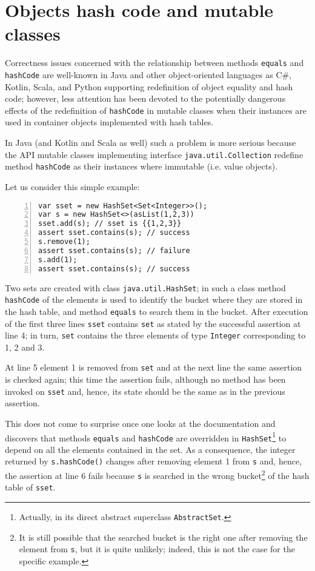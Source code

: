 \section{Objects hash code and mutable classes}

Correctness issues concerned with the relationship between methods \lstinline{equals} and \lstinline{hashCode} are well-known
in Java \cite{Bloch18,OkanoHSON19} and other object-oriented languages as C\#, Kotlin, Scala, and Python supporting redefinition
of object equality and hash code; however, less attention has been devoted to the potentially dangerous effects of the redefinition of 
\lstinline{hashCode} in mutable classes when their instances are used in container objects implemented with hash tables.

In Java (and Kotlin and Scala as well)  such a problem is more serious because the API mutable classes implementing interface \lstinline{java.util.Collection} redefine method \lstinline{hashCode} as their instances where immutable (i.e. value objects).

Let us consider this simple example:
\begin{lstlisting}[numbers=left]
var sset = new HashSet<Set<Integer>>();
var s = new HashSet<>(asList(1,2,3))
sset.add(s); // sset is {{1,2,3}}
assert sset.contains(s); // success
s.remove(1);
assert sset.contains(s); // failure
s.add(1);
assert sset.contains(s); // success
\end{lstlisting}
Two sets are created with class \lstinline{java.util.HashSet}; in such a class method \lstinline{hashCode} of the elements is used to identify the
bucket where they are stored in the hash table, and method \lstinline{equals} to search them in the bucket.
After execution of the first three lines \lstinline{sset} contains \lstinline{set} as stated by the successful assertion at line 4; in turn, \lstinline{set}
contains the three elements of type \lstinline{Integer} corresponding to 1, 2 and 3.

At line 5 element 1 is removed from \lstinline{set} and at the next line the same assertion is checked again; this time the assertion fails, although no method has been invoked on \lstinline{sset} and, hence, its state should be the same as in the previous assertion.

This does not come to surprise once one looks at the documentation and discovers that methods \lstinline{equals} and \lstinline{hashCode} are overridden in \lstinline{HashSet}\footnote{Actually, in its direct abstract superclass \lstinline{AbstractSet}.} to depend on all the elements contained in the set. As a consequence, the integer returned by  \lstinline{s.hashCode()} changes after removing element 1 from \lstinline{s} and, hence, the assertion at line 6 fails because \lstinline{s} is searched in the wrong bucket\footnote{It is still possible that the searched bucket is the right one after removing the element from \lstinline{s}, but it is quite unlikely; indeed, this is not the case for the specific example.} of the hash table of \lstinline{sset}.


